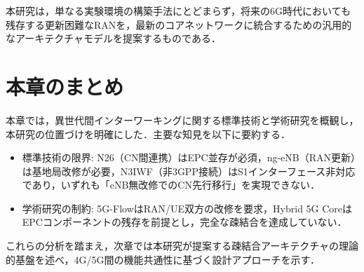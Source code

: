本研究は，単なる実験環境の構築手法にとどまらず，将来の6G時代においても残存する更新困難なRANを，最新のコアネットワークに統合するための汎用的なアーキテクチャモデルを提案するものである．
\section{本章のまとめ}

本章では，異世代間インターワーキングに関する標準技術と学術研究を概観し，本研究の位置づけを明確にした．主要な知見を以下に要約する．

\begin{itemize}
    \item 標準技術の限界: N26（CN間連携）はEPC並存が必須，ng-eNB（RAN更新）は基地局改修が必要，N3IWF（非3GPP接続）はS1インターフェース非対応であり，いずれも「eNB無改修でのCN先行移行」を実現できない．
    \item 学術研究の制約: 5G-FlowはRAN/UE双方の改修を要求，Hybrid 5G CoreはEPCコンポーネントの残存を前提とし，完全な疎結合を達成していない．
\end{itemize}

これらの分析を踏まえ，次章では本研究が提案する疎結合アーキテクチャの理論的基盤を述べ，4G/5G間の機能共通性に基づく設計アプローチを示す．
